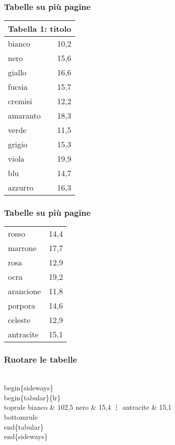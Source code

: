 \documentclass[svgnames,%
	ucs,%
	pdftex]{guitbeamer}
\begin{document}
\begin{frame}
  \frametitle{Tabelle su pi\`u pagine}
	\begin{LaTeXoutput}
		\begin{longtable}{lr}
		\multicolumn{2}{c}{Tabella 1: titolo}\\[1ex]\hline %
		bianco		& 10,2 \\
		nero		& 15,6 \\
		giallo		& 16,6 \\
		fucsia		& 15,7 \\
		cremisi		& 12,2 \\
		amaranto	& 18,3 \\
		verde		& 11,5 \\
		grigio		& 15,3 \\
		viola		& 19,9 \\
		blu		& 14,7 \\
		azzurro		& 16,3 
		\end{longtable}
	\end{LaTeXoutput}
\end{frame}
\begin{frame}
  \frametitle{Tabelle su pi\`u pagine}
	\begin{LaTeXoutput}
		\begin{longtable}{lr} %
		rosso		& 14,4 \\
		marrone		& 17,7 \\
		rosa		& 12,9 \\
		ocra		& 19,2 \\
		arancione	& 11,8 \\
		porpora		& 14,6 \\
		celeste		& 12,9 \\
		antracite	& 15,1 \\
		\hline
		\end{longtable}
	\end{LaTeXoutput}
\end{frame}
\begin{frame}
  \frametitle{Ruotare le tabelle}
	\begin{LaTeXcode}
		\alert{\\begin\{sideways\}}\n
		\\begin\{tabular\}\{lr\}\
		\\toprule\n
		\hspace*{5ex}bianco    \& 102,5 \bs\bs\n
		\hspace*{5ex}nero      \& 15,4 \bs\bs\n
		\hspace*{10ex}\vdots\n
		\hspace*{5ex}antracite \& 15,1 \bs\bs\\bottomrule\n
		\\end\{tabular\}\n
		\alert{\\end\{sideways\}}
	\end{LaTeXcode}
\end{frame}
\end{document}
